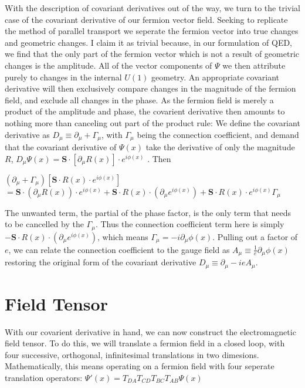 \documentclass{article}
\begin{document}
        With the description of covariant derivatives out of the way, we turn to the trivial case of the covariant derivative of our fermion vector field. Seeking to replicate the method of parallel transport we seperate the fermion vector into true changes and geometric changes. I claim it as trivial because, in our formulation of QED, we find that the only part of the fermion vector which is not a result of geometric changes is the amplitude. All of the vector components of $\Psi$ we then attribute purely to changes in the internal $U(1)$ geometry. An appropriate covariant derivative will then exclusively compare changes in the magnitude of the fermion field, and exclude all changes in the phase. As the fermion field is merely a product of the amplitude and phase, the covarient derivative then amounts to nothing more than canceling out part of the product rule:
        We define the covariant derivative as $ D_\mu \equiv \partial_\mu + \Gamma_\mu $, with $\Gamma_\mu$ being the connection coefficient,
        and demand that the covariant derivative of $ \Psi(x) $ take the derivative of only the magnitude $R$,
        $D_\mu \Psi(x) = \mathbf{S} \cdot [\partial_\mu R(x) ] \cdot e^{i\phi(x)} $ . Then
        
        $ (\partial_\mu + \Gamma_\mu) [  \mathbf{S} \cdot R(x) \cdot e^{i\phi(x)} ] $ 
        $ = \mathbf{S} \cdot (\partial_\mu R(x) ) \cdot e^{i\phi(x)} +
           \mathbf{S} \cdot  R(x)  \cdot (\partial_\mu e^{i\phi(x)}) +
           \mathbf{S} \cdot  R(x)  \cdot e^{i\phi(x)} \Gamma_\mu $

        The unwanted term, the partial of the phase factor, is the only term that needs to be cancelled by the $\Gamma_\mu$. Thus the connection coefficient term here is simply $ - \mathbf{S} \cdot  R(x)  \cdot (\partial_\mu e^{i\phi(x)})  $, which means 
        $\Gamma_\mu = - i \partial_\mu \phi(x) $. Pulling out a factor of $e$, we can relate the connection coefficient to the gauge field
        as $A_\mu \equiv \frac{1}{e} \partial_\mu \phi(x)$ restoring the original form of the covariant derivative
        $ D_\mu \equiv \partial_\mu - i e A_\mu $.


\section{Field Tensor}
        With our covarient derivative in hand, we can now construct the electromagnetic field tensor. To do this, we will translate a fermion field in a closed loop, with four successive, orthogonal, infinitesimal translations in two dimesions. Mathematically, this means operating on a fermion field with four seperate translation operators:
        $ \Psi'(x) = T_{DA} T_{CD} T_{BC} T_{AB} \Psi(x) $
        
\end{document}
